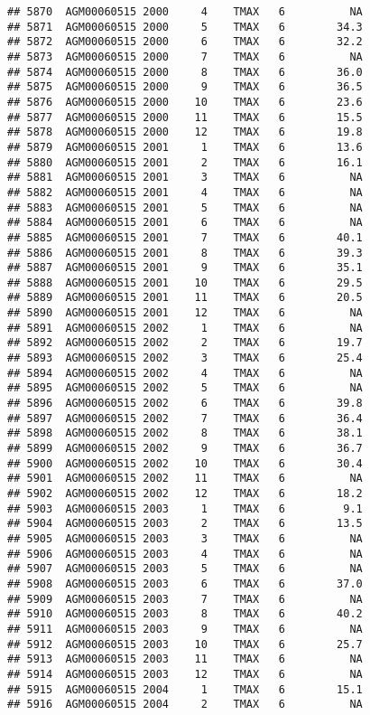 \documentclass{article}\usepackage[]{graphicx}\usepackage[]{color}
\makeatletter
\newenvironment{kframe}{%
 \def\at@end@of@kframe{}%
 \ifinner\ifhmode%
  \def\at@end@of@kframe{\end{minipage}}%
  \begin{minipage}{\columnwidth}%
 \fi\fi%
 \def\FrameCommand##1{\hskip\@totalleftmargin \hskip-\fboxsep
 \colorbox{shadecolor}{##1}\hskip-\fboxsep
     \hskip-\linewidth \hskip-\@totalleftmargin \hskip\columnwidth}%
 \MakeFramed {\advance\hsize-\width
   \@totalleftmargin\z@ \linewidth\hsize
   \@setminipage}}%
 {\par\unskip\endMakeFramed%
 \at@end@of@kframe}
\newenvironment{knitrout}{}{} %
\makeatother
\begin{document}
\begin{knitrout}
\begin{kframe}
\begin{verbatim}
## 5870  AGM00060515 2000     4    TMAX   6          NA
## 5871  AGM00060515 2000     5    TMAX   6        34.3
## 5872  AGM00060515 2000     6    TMAX   6        32.2
## 5873  AGM00060515 2000     7    TMAX   6          NA
## 5874  AGM00060515 2000     8    TMAX   6        36.0
## 5875  AGM00060515 2000     9    TMAX   6        36.5
## 5876  AGM00060515 2000    10    TMAX   6        23.6
## 5877  AGM00060515 2000    11    TMAX   6        15.5
## 5878  AGM00060515 2000    12    TMAX   6        19.8
## 5879  AGM00060515 2001     1    TMAX   6        13.6
## 5880  AGM00060515 2001     2    TMAX   6        16.1
## 5881  AGM00060515 2001     3    TMAX   6          NA
## 5882  AGM00060515 2001     4    TMAX   6          NA
## 5883  AGM00060515 2001     5    TMAX   6          NA
## 5884  AGM00060515 2001     6    TMAX   6          NA
## 5885  AGM00060515 2001     7    TMAX   6        40.1
## 5886  AGM00060515 2001     8    TMAX   6        39.3
## 5887  AGM00060515 2001     9    TMAX   6        35.1
## 5888  AGM00060515 2001    10    TMAX   6        29.5
## 5889  AGM00060515 2001    11    TMAX   6        20.5
## 5890  AGM00060515 2001    12    TMAX   6          NA
## 5891  AGM00060515 2002     1    TMAX   6          NA
## 5892  AGM00060515 2002     2    TMAX   6        19.7
## 5893  AGM00060515 2002     3    TMAX   6        25.4
## 5894  AGM00060515 2002     4    TMAX   6          NA
## 5895  AGM00060515 2002     5    TMAX   6          NA
## 5896  AGM00060515 2002     6    TMAX   6        39.8
## 5897  AGM00060515 2002     7    TMAX   6        36.4
## 5898  AGM00060515 2002     8    TMAX   6        38.1
## 5899  AGM00060515 2002     9    TMAX   6        36.7
## 5900  AGM00060515 2002    10    TMAX   6        30.4
## 5901  AGM00060515 2002    11    TMAX   6          NA
## 5902  AGM00060515 2002    12    TMAX   6        18.2
## 5903  AGM00060515 2003     1    TMAX   6         9.1
## 5904  AGM00060515 2003     2    TMAX   6        13.5
## 5905  AGM00060515 2003     3    TMAX   6          NA
## 5906  AGM00060515 2003     4    TMAX   6          NA
## 5907  AGM00060515 2003     5    TMAX   6          NA
## 5908  AGM00060515 2003     6    TMAX   6        37.0
## 5909  AGM00060515 2003     7    TMAX   6          NA
## 5910  AGM00060515 2003     8    TMAX   6        40.2
## 5911  AGM00060515 2003     9    TMAX   6          NA
## 5912  AGM00060515 2003    10    TMAX   6        25.7
## 5913  AGM00060515 2003    11    TMAX   6          NA
## 5914  AGM00060515 2003    12    TMAX   6          NA
## 5915  AGM00060515 2004     1    TMAX   6        15.1
## 5916  AGM00060515 2004     2    TMAX   6          NA

\end{verbatim}
\end{kframe}
\end{knitrout}
\end{document}
